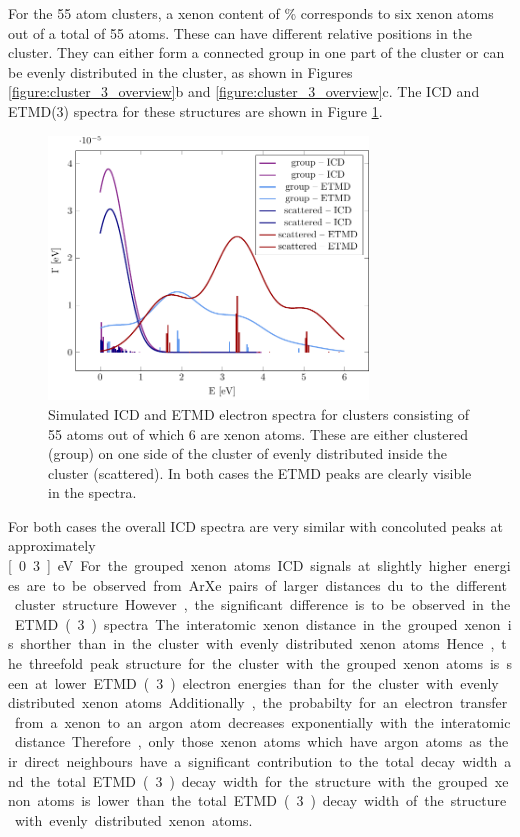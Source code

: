 For the 55 atom clusters, a xenon content of \unit[10--12]{\%}
corresponds to six xenon atoms out of a total of 55 atoms. These can have
different relative positions in the cluster. They can either form a connected 
group in one part of the cluster or can be evenly distributed in the cluster,
as shown in Figures \ref{figure:cluster_3_overview}b and \ref{figure:cluster_3_overview}c. The
ICD and ETMD(3) spectra for these structures are shown in Figure \ref{figure:ar_3_6in}.

\begin{figure}[h]
 \centering
 \includegraphics[width=8.5cm]{pics/ar_3_6in.pdf}
 \caption{Simulated ICD and ETMD electron spectra for clusters consisting of
          55 atoms out of which 6 are xenon atoms. These are either clustered
          (group) on one side of the cluster of evenly distributed
          inside the cluster (scattered). In both cases the ETMD peaks are
          clearly visible in the spectra.}
 \label{figure:ar_3_6in}
\end{figure}

For both cases the overall ICD spectra are very similar with concoluted
peaks at approximately \unit[0.3]{eV}. For the grouped xenon atoms ICD
signals at slightly higher energies are to be observed from ArXe pairs of
larger distances du to the different cluster structure. However, the
significant difference is to be observed in the ETMD(3) spectra. The
interatomic xenon distance in the grouped xenon is shorther than in the
cluster with evenly distributed xenon atoms. Hence, the threefold
peak structure for the cluster with the grouped xenon atoms is seen at
lower ETMD(3) electron energies than for the cluster with evenly
distributed xenon atoms. Additionally, the probabilty for an electron
transfer from a xenon to an argon atom decreases exponentially with the
interatomic distance. Therefore, only those xenon atoms which have argon
atoms as their direct neighbours have a significant contribution to the
total decay width and the total ETMD(3) decay width for the structure with
the grouped xenon atoms is lower than the total ETMD(3) decay width of
the structure with evenly distributed xenon atoms.


